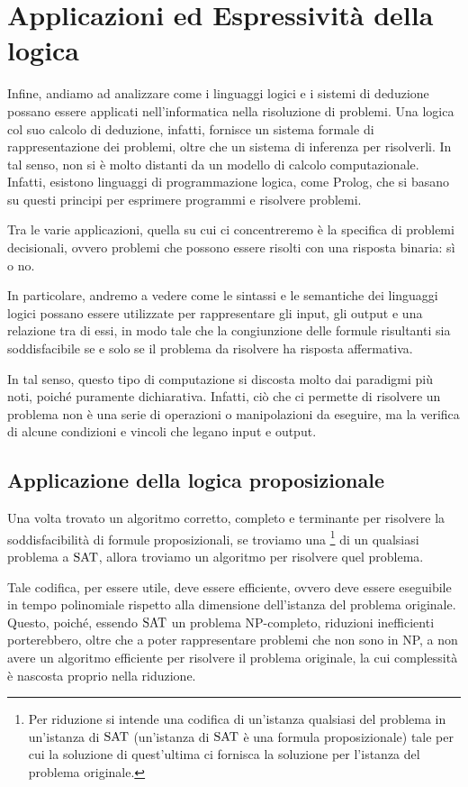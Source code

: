 \chapter{Applicazioni ed Espressività della logica}

Infine, andiamo ad analizzare come i linguaggi logici e i sistemi di deduzione possano essere applicati nell'informatica nella risoluzione di problemi. Una logica col suo calcolo di deduzione, infatti, fornisce un sistema formale di rappresentazione dei problemi, oltre che un sistema di inferenza per risolverli. 
In tal senso, non si è molto distanti da un modello di calcolo computazionale.
Infatti, esistono linguaggi di programmazione logica, come Prolog, che si basano su questi principi per esprimere programmi e risolvere problemi.

Tra le varie applicazioni, quella su cui ci concentreremo è la specifica di problemi decisionali, ovvero problemi che possono essere risolti con una risposta binaria: sì o no.

In particolare, andremo a vedere come le sintassi e le semantiche dei linguaggi logici possano essere utilizzate per rappresentare gli input, gli output e una relazione tra di essi, in modo tale che la congiunzione delle formule risultanti sia soddisfacibile se e solo se il problema da risolvere ha risposta affermativa.

In tal senso, questo tipo di computazione si discosta molto dai paradigmi più noti, poiché puramente dichiarativa. Infatti, ciò che ci permette di risolvere un problema non è una serie di operazioni o manipolazioni da eseguire, ma la verifica di alcune condizioni e vincoli che legano input e output.

\section{Applicazione della logica proposizionale}

Una volta trovato un algoritmo corretto, completo e terminante per risolvere la soddisfacibilità di formule proposizionali, se troviamo una \footnote{Per riduzione si intende una codifica di un'istanza qualsiasi del problema in un'istanza di \(\Sat\) (un'istanza di \(\Sat\) è una formula proposizionale) tale per cui la soluzione di quest'ultima ci fornisca la soluzione per l'istanza del problema originale.} di un qualsiasi problema a \(\Sat\), allora troviamo un algoritmo per risolvere quel problema.

Tale codifica, per essere utile, deve essere efficiente, ovvero deve essere eseguibile in tempo polinomiale rispetto alla dimensione dell'istanza del problema originale. Questo, poiché, essendo \(\Sat\) un problema NP-completo, riduzioni inefficienti porterebbero, oltre che a poter rappresentare problemi che non sono in NP, a non avere un algoritmo efficiente per risolvere il problema originale, la cui complessità è nascosta proprio nella riduzione.

